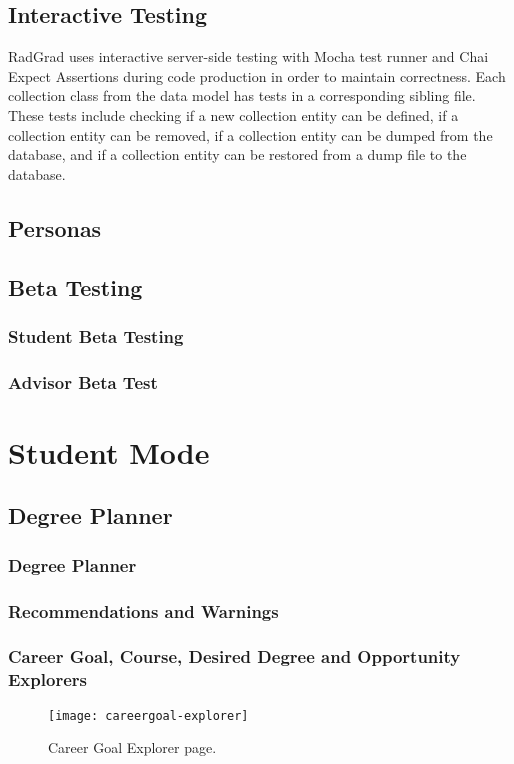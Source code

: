 \subsection{Interactive Testing}
RadGrad uses interactive server-side testing with Mocha test runner and Chai Expect Assertions during code production in order to maintain correctness. Each collection class from the data model has tests in a corresponding sibling file. These tests include checking if a new collection entity can be defined, if a collection entity can be removed, if a collection entity can be dumped from the database, and if a collection entity can be restored from a dump file to the database.     

\subsection{Personas}
\subsection{Beta Testing}
\subsubsection{Student Beta Testing}
\subsubsection{Advisor Beta Test}

\section{Student Mode}
\subsection{Degree Planner}
\subsubsection{Degree Planner}

\subsubsection{Recommendations and Warnings}

\subsubsection{Career Goal, Course, Desired Degree and Opportunity Explorers}
\begin{figure}[h]
\centering
\texttt{[image: careergoal-explorer]}
\caption{Career Goal Explorer page.}
\end{figure}

